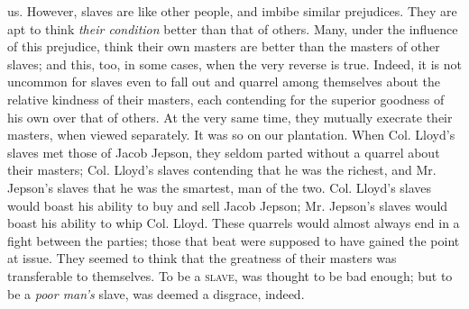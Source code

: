 us. However, slaves are like other people, and imbibe similar
prejudices. They are apt to think \emph{their condition} better than
that of others. Many, under the influence of this prejudice, think their
own masters are better than the masters of other slaves; and this, too,
in some cases, when the very reverse is true. Indeed, it is not uncommon
for slaves even to fall out and quarrel among themselves about the
relative kindness of their masters, each contending for the superior
goodness of his own over that of others. At the very same time, they
mutually execrate their masters, when viewed separately. It was so on
our plantation. When Col. Lloyd's slaves met those of Jacob Jepson, they
seldom parted without a quarrel about their masters; Col. Lloyd's slaves
contending that he was the richest, and Mr. Jepson's slaves that he was
the smartest, man of the two. Col. Lloyd's slaves would boast his
ability to buy and sell Jacob Jepson; Mr. Jepson's slaves would boast
his ability to whip Col. Lloyd. These quarrels would almost always end
in a fight between the parties; those that beat were supposed to have
gained the point at issue. They seemed to think that the greatness of
their masters was transferable to themselves. To be a \textsc{slave},
was thought to be bad enough; but to be a \emph{poor man's} slave, was
deemed a disgrace, indeed.
